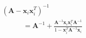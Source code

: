 \documentclass[10pt]{article}
\begin{document}
\begin{align*}\begin{split}
&\left( \boldsymbol A - \boldsymbol x_i \boldsymbol x_i^T \right)^{-1} \\
&\phantom{100000} = \boldsymbol A^{-1} + \frac{\boldsymbol A^{-1} \boldsymbol x_i \boldsymbol x_i^T \boldsymbol A^{-1}}{1 - \boldsymbol x_i^T \boldsymbol A^{-1} \boldsymbol x_i}\\
\end{split}\end{align*}
\end{document}
